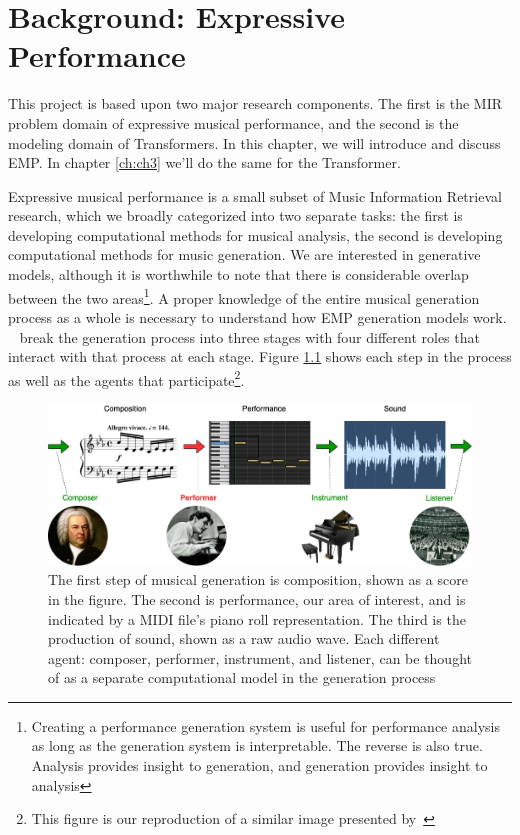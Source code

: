 
\chapter{Background: Expressive Performance}\label{ch:ch2}
This project is based upon two major research components. The first is the MIR problem domain of expressive musical performance, and the second is the modeling domain of Transformers. In this chapter, we will introduce and discuss EMP. In chapter \ref{ch:ch3} we'll do the same for the Transformer. 

Expressive musical performance is a small subset of Music Information Retrieval research, which we broadly categorized into two separate tasks: the first is developing computational methods for musical analysis, the second is developing computational methods for music generation. We are interested in generative models, although it is worthwhile to note that there is considerable overlap between the two areas\footnote{Creating a performance generation system is useful for performance analysis as long as the generation system is interpretable. The reverse is also true. Analysis provides insight to generation, and generation provides insight to analysis}. A proper knowledge of the entire musical generation process as a whole is necessary to understand how EMP generation models work. ~\citet{ji2020comprehensive} break the generation process into three stages with four different roles that interact with that process at each stage. Figure \ref{fig:generation_process} shows each step in the process as well as the agents that participate\footnote{This figure is our reproduction of a similar image presented by~\citet{ji2020comprehensive}}. 

\begin{figure}
    \centering
    \includegraphics[width=1\linewidth]{figs/ch2/musical_generation.jpg}
    \caption{The first step of musical generation is composition, shown as a score in the figure. The second is performance, our area of interest, and is indicated by a MIDI file's piano roll representation. The third is the production of sound, shown as a raw audio wave. Each different agent: composer, performer, instrument, and listener, can be thought of as a separate computational model in the generation process}
    \label{fig:generation_process}
\end{figure}


